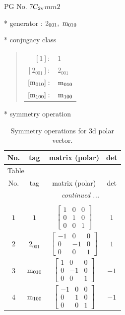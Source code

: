 \documentclass[fleqn,8pt]{jsarticle}
\begin{document}
\setcounter{MaxMatrixCols}{32}

\renewcommand{\tablename}{Table~}
\renewcommand{\figurename}{Figure~}
\begin{center}
\LARGE
PG No. 7\quad$C_{\rm 2v}$\quad$mm2$\quad[ orthorhombic ]
\end{center}

* generator : $2{}_{001},\,\,{\rm m}_{010}$

* conjugacy class
\begin{quote}
\begin{tabular}{rl}
$ [1]: $ & $ 1 $ \\
$ [2{}_{001}]: $ & $ 2{}_{001} $ \\
$ [{\rm m}_{010}]: $ & $ {\rm m}_{010} $ \\
$ [{\rm m}_{100}]: $ & $ {\rm m}_{100} $
\end{tabular}
\end{quote}

* symmetry operation
\renewcommand{\arraystretch}{1.3}
\begin{longtable}{cccc}
\caption{Symmetry operations for 3d polar vector.}
 \\
 \hline \hline
No. & tag & matrix (polar) & det \\ \hline \endfirsthead

\multicolumn{3}{l}{\tablename\ \thetable{}} \\
 \hline \hline
No. & tag & matrix (polar) & det \\ \hline \endhead

 \hline \hline
\multicolumn{3}{r}{\footnotesize\it continued ...} \\ \endfoot

 \hline \hline
\multicolumn{3}{r}{} \\ \endlastfoot

$ 1 $ & $ 1 $ & $ \begin{bmatrix} 1 & 0 & 0 \\ 0 & 1 & 0 \\ 0 & 0 & 1 \end{bmatrix} $ & $ 1 $ \\ \hline
$ 2 $ & $ 2{}_{001} $ & $ \begin{bmatrix} -1 & 0 & 0 \\ 0 & -1 & 0 \\ 0 & 0 & 1 \end{bmatrix} $ & $ 1 $ \\ \hline
$ 3 $ & $ {\rm m}_{010} $ & $ \begin{bmatrix} 1 & 0 & 0 \\ 0 & -1 & 0 \\ 0 & 0 & 1 \end{bmatrix} $ & $ -1 $ \\ \hline
$ 4 $ & $ {\rm m}_{100} $ & $ \begin{bmatrix} -1 & 0 & 0 \\ 0 & 1 & 0 \\ 0 & 0 & 1 \end{bmatrix} $ & $ -1 $ \\
\end{longtable}
\end{document}
